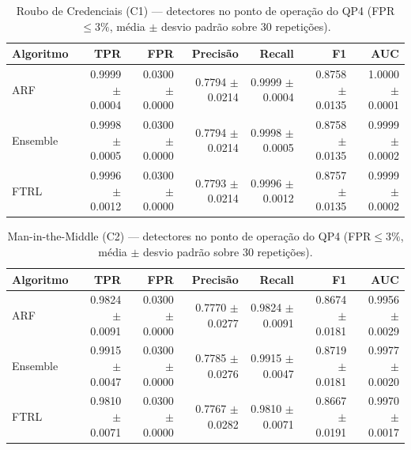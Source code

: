 
\begin{table}[htbp]
\centering
\caption{Roubo de Credenciais (C1) — detectores no ponto de operação do QP4 (FPR$\le 3\%$, média $\pm$ desvio padrão sobre 30 repetições).}
\label{tab:8-1}
\begin{tabular}{lrrrrrr}
\toprule
Algoritmo & TPR & FPR & Precis\~ao & Recall & F1 & AUC \\
\midrule
ARF & 0.9999 $\pm$ 0.0004 & 0.0300 $\pm$ 0.0000 & 0.7794 $\pm$ 0.0214 & 0.9999 $\pm$ 0.0004 & 0.8758 $\pm$ 0.0135 & 1.0000 $\pm$ 0.0001 \\
Ensemble & 0.9998 $\pm$ 0.0005 & 0.0300 $\pm$ 0.0000 & 0.7794 $\pm$ 0.0214 & 0.9998 $\pm$ 0.0005 & 0.8758 $\pm$ 0.0135 & 0.9999 $\pm$ 0.0002 \\
FTRL & 0.9996 $\pm$ 0.0012 & 0.0300 $\pm$ 0.0000 & 0.7793 $\pm$ 0.0214 & 0.9996 $\pm$ 0.0012 & 0.8757 $\pm$ 0.0135 & 0.9999 $\pm$ 0.0002 \\
\bottomrule
\end{tabular}
\end{table}

\begin{table}[htbp]
\centering
\caption{Man-in-the-Middle (C2) — detectores no ponto de operação do QP4 (FPR$\le 3\%$, média $\pm$ desvio padrão sobre 30 repetições).}
\label{tab:8-2}
\begin{tabular}{lrrrrrr}
\toprule
Algoritmo & TPR & FPR & Precis\~ao & Recall & F1 & AUC \\
\midrule
ARF & 0.9824 $\pm$ 0.0091 & 0.0300 $\pm$ 0.0000 & 0.7770 $\pm$ 0.0277 & 0.9824 $\pm$ 0.0091 & 0.8674 $\pm$ 0.0181 & 0.9956 $\pm$ 0.0029 \\
Ensemble & 0.9915 $\pm$ 0.0047 & 0.0300 $\pm$ 0.0000 & 0.7785 $\pm$ 0.0276 & 0.9915 $\pm$ 0.0047 & 0.8719 $\pm$ 0.0181 & 0.9977 $\pm$ 0.0020 \\
FTRL & 0.9810 $\pm$ 0.0071 & 0.0300 $\pm$ 0.0000 & 0.7767 $\pm$ 0.0282 & 0.9810 $\pm$ 0.0071 & 0.8667 $\pm$ 0.0191 & 0.9970 $\pm$ 0.0017 \\
\bottomrule
\end{tabular}
\end{table}

